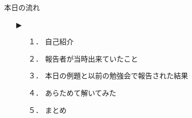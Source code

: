 \begin{frame}{本日の流れ}
  \begin{itemize}
     \item[▶] 
     \begin{itemize}[itemsep=1.3ex, leftmargin=1cm]
       \item[１．] 自己紹介
       \item[２．] 報告者が当時出来ていたこと
       \item[３．] 本日の例題と以前の勉強会で報告された結果
       \item[４．] あらためて解いてみた
       \item[５．] まとめ
    \end{itemize}
  \end{itemize}
\end{frame}
